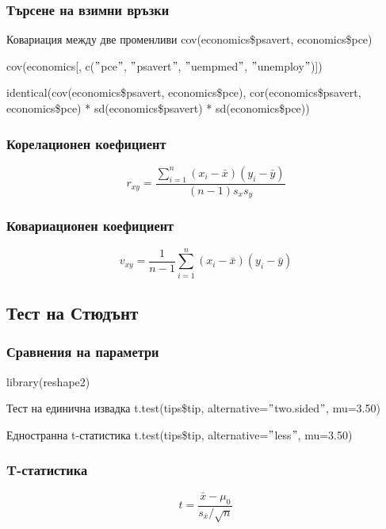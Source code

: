 \documentclass{beamer}
\begin{document}
\begin{frame}
\frametitle{Търсене на взимни връзки}
\begin{block}{Ковариация между две променливи}
cov(economics\$psavert, economics\$pce)

cov(economics[, c($"$pce$"$, $"$psavert$"$, $"$uempmed$"$, $"$unemploy$"$)])

identical(cov(economics\$psavert, economics\$pce), cor(economics\$psavert, economics\$pce) * sd(economics\$psavert) * sd(economics\$pce))
\end{block}
\end{frame}

\begin{frame}
\frametitle{Корелационен коефициент}
\begin{equation}
r_{xy} = \frac{\sum_{i=1}^{n}(x_i-\bar{x})(y_i-\bar{y})}{(n-1)s_xs_y}
\end{equation}
\end{frame}

\begin{frame}
\frametitle{Ковариационен коефициент}
\begin{equation}
v_{xy} = \frac{1}{n-1}\sum_{i=1}^{n}(x_i-\bar{x})(y_i-\bar{y})
\end{equation}
\end{frame}

\subsection{Тест на Стюдънт}

\begin{frame}
\frametitle{Сравнения на параметри}
\begin{block}{}
library(reshape2)
\end{block}

\begin{block}{Тест на единична извадка}
t.test(tips\$tip, alternative=$"$two.sided$"$, mu=3.50)
\end{block}

\begin{block}{Едностранна t-статистика}
t.test(tips\$tip, alternative=$"$less$"$, mu=3.50)
\end{block}
\end{frame}

\begin{frame}
\frametitle{T-статистика}
\begin{equation}
t = \frac{\bar{x}-\mu_0}{s_{\bar{x}}/\sqrt{n}}
\end{equation}
\end{frame}
\end{document}
